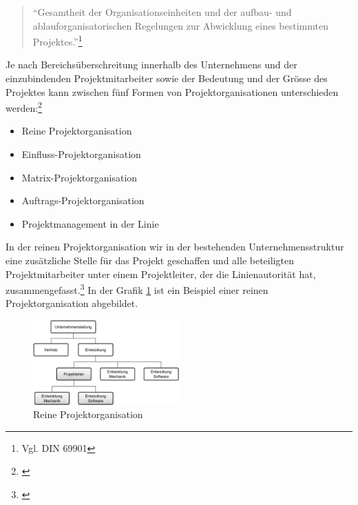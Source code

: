 \begin{quote}
``Gesamtheit der Organisationseinheiten und der aufbau- und ablauforganisatorischen
Regelungen zur Abwicklung eines bestimmten Projektes.''\footnote{Vgl. DIN 69901}
\end{quote}

Je nach Bereichsüberschreitung innerhalb des Unternehmens und der einzubindenden
Projektmitarbeiter sowie der Bedeutung und der Grösse des Projektes kann zwischen
fünf Formen von Projektorganisationen unterschieden werden:\footnote{\citealp*[Vgl.][S. 56]{burghardt2007einfuehrung}}

\begin{itemize}
    \item Reine Projektorganisation
    \item Einfluss-Projektorganisation
    \item Matrix-Projektorganisation
    \item Auftrags-Projektorganisation
    \item Projektmanagement in der Linie
\end{itemize}

In der reinen Projektorganisation wir in der bestehenden Unternehmensstruktur
eine zusätzliche Stelle für das Projekt geschaffen und alle beteiligten 
Projektmitarbeiter unter einem Projektleiter, der die Linienautorität hat, 
zusammengefasst.\footnote{\citealp*[Vgl.][S. 56]{burghardt2007einfuehrung}}
In der Grafik \ref{pic:05_projektorganisationen_reine} ist 
ein Beispiel einer reinen Projektorganisation abgebildet.

\begin{figure}[htbp]
\begin{center}
\includegraphics[width=0.5\textwidth,angle=0]{./bilder/theorie/05_projektorganisationen_reine.pdf}
\caption[Reine Projektorganisation]{Reine Projektorganisation\footnotemark}
\label{pic:05_projektorganisationen_reine}
\end{center}
\end{figure}

